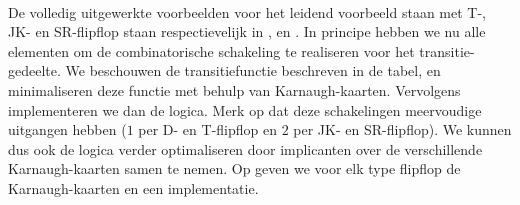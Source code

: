 \paragraph{}
De volledig uitgewerkte voorbeelden voor het leidend voorbeeld staan met T-, JK- en SR-flipflop staan respectievelijk in ,  en . In principe hebben we nu alle elementen om de combinatorische schakeling te realiseren voor het transitie-gedeelte. We beschouwen de transitiefunctie beschreven in de tabel, en minimaliseren deze functie met behulp van Karnaugh-kaarten. Vervolgens implementeren we dan de logica. Merk op dat deze schakelingen meervoudige uitgangen hebben ($1$ per D- en T-flipflop en $2$ per JK- en SR-flipflop). We kunnen dus ook de logica verder optimaliseren door implicanten over de verschillende Karnaugh-kaarten samen te nemen. Op  geven we voor elk type flipflop de Karnaugh-kaarten en een implementatie.
